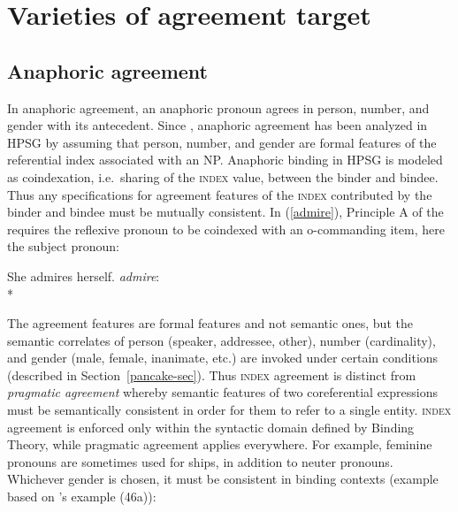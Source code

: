 \documentclass[output=paper,biblatex,babelshorthands,newtxmath,draftmode,colorlinks,citecolor=brown]{langscibook}
\begin{document}
\section{Varieties of agreement target} 
\label{agreement:varieties-of-agreement}

\subsection{Anaphoric agreement}
\label{ana-agr}\label{agreement:sec-anaphotic-agreement}

In anaphoric agreement, an anaphoric pronoun agrees in person, number, and gender with its
antecedent.  Since \citet{Pollard+Sag:1992,Pollard+Sag:1994}, anaphoric agreement has been analyzed
in HPSG by assuming that person, number, and gender are formal features of the referential index
associated with an NP.  Anaphoric binding in HPSG is modeled as coindexation, i.e.\ sharing of the
\textsc{index} value, between the binder and bindee.  Thus any specifications for agreement features
of the \textsc{index} contributed by the binder and bindee must be mutually consistent.  In
(\ref{admire}), Principle A of the   requires the
reflexive pronoun to be coindexed with an o-commanding item, here the subject pronoun:  

\begin{exe}
\ex  
 \begin{xlist}  \label{admire}
\ex She admires herself.  
\ex \textit{admire}:\\*
\end{xlist}
\end{exe}

\noindent
The agreement features are formal features and not semantic ones, but the semantic correlates of person (speaker, addressee, other), number (cardinality), and gender (male, female, inanimate, etc.) are invoked under certain conditions (described in Section~\ref{pancake-sec}).   
Thus \textsc{index} agreement is distinct from \textit{pragmatic agreement} whereby semantic features of two
coreferential expressions must be semantically consistent in order for them to refer to a single
entity.  \textsc{index} agreement is enforced only within the  syntactic domain defined by Binding Theory,
while pragmatic agreement applies everywhere.   For example, feminine pronouns are sometimes used
for ships, in addition to neuter pronouns.  Whichever gender is chosen, it must be consistent in
binding contexts (example based on \citeauthor{Pollard+Sag:1994}'s \citeyear[79]{Pollard+Sag:1994} example (46a)):
\end{document}

